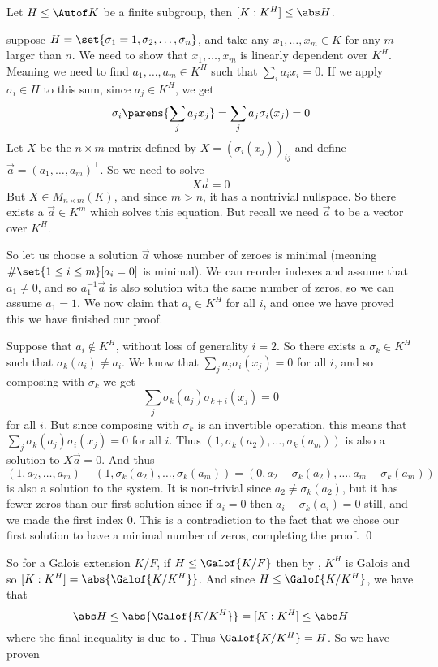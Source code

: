 \blemm[title=Artin's Lemma, name=artin]

    Let $H\leq\Autof K$ be a finite subgroup, then $[K:K^H]\leq\abs H$.

\elemm

\Proof suppose $H=\set{\sigma_1=1,\sigma_2,\dots,\sigma_n}$, and take any $x_1,\dots,x_m\in K$ for any $m$ larger than $n$.
We need to show that $x_1,\dots,x_m$ is linearly dependent over $K^H$.
Meaning we need to find $a_1,\dots,a_m\in K^H$ such that $\sum_ia_ix_i=0$.
If we apply $\sigma_i\in H$ to this sum, since $a_j\in K^H$, we get
$$ \sigma_i\parens{\sum_ja_jx_j} = \sum_ja_j\sigma_i(x_j) = 0 $$
Let $X$ be the $n\times m$ matrix defined by $X=(\sigma_i(x_j))_{ij}$ and define $\vec a=(a_1,\dots,a_m)^\top$.
So we need to solve
$$ X\vec a = 0 $$
But $X\in M_{n\times m}(K)$, and since $m>n$, it has a nontrivial nullspace.
So there exists a $\vec a\in K^m$ which solves this equation.
But recall we need $\vec a$ to be a vector over $K^H$.

So let us choose a solution $\vec a$ whose number of zeroes is minimal (meaning $\#\set{1\leq i\leq m}[a_i=0]$ is minimal).
We can reorder indexes and assume that $a_1\neq0$, and so $a_1^{-1}\vec a$ is also solution with the same number of zeros, so we can assume $a_1=1$.
We now claim that $a_i\in K^H$ for all $i$, and once we have proved this we have finished our proof.

Suppose that $a_i\notin K^H$, without loss of generality $i=2$.
So there exists a $\sigma_k\in K^H$ such that $\sigma_k(a_i)\neq a_i$.
We know that $\sum_ja_j\sigma_i(x_j)=0$ for all $i$, and so composing with $\sigma_k$ we get
$$ \sum_j\sigma_k(a_j)\sigma_{k+i}(x_j) = 0 $$
for all $i$.
But since composing with $\sigma_k$ is an invertible operation, this means that $\sum_j\sigma_k(a_j)\sigma_i(x_j)=0$ for all $i$.
Thus $(1,\sigma_k(a_2),\dots,\sigma_k(a_m))$ is also a solution to $X\vec a=0$.
And thus
$$ (1,a_2,\dots,a_m) - (1,\sigma_k(a_2),\dots,\sigma_k(a_m)) = (0,a_2-\sigma_k(a_2),\dots,a_m-\sigma_k(a_m)) $$
is also a solution to the system.
It is non-trivial since $a_2\neq\sigma_k(a_2)$, but it has fewer zeros than our first solution since if $a_i=0$ then $a_i-\sigma_k(a_i)=0$ still, and we made the first index $0$.
This is a contradiction to the fact that we chose our first solution to have a minimal number of zeros, completing the proof.
\qed

So for a Galois extension $K/F$, if $H\leq\Galof{K/F}$ then by , $K^H$ is Galois and so $[K:K^H]=\abs{\Galof{K/K^H}}$.
And since $H\leq\Galof{K/K^H}$, we have that
$$ \abs H\leq\abs{\Galof{K/K^H}}=[K:K^H] \leq \abs H $$
where the final inequality is due to .
Thus $\Galof{K/K^H}=H$.
So we have proven

